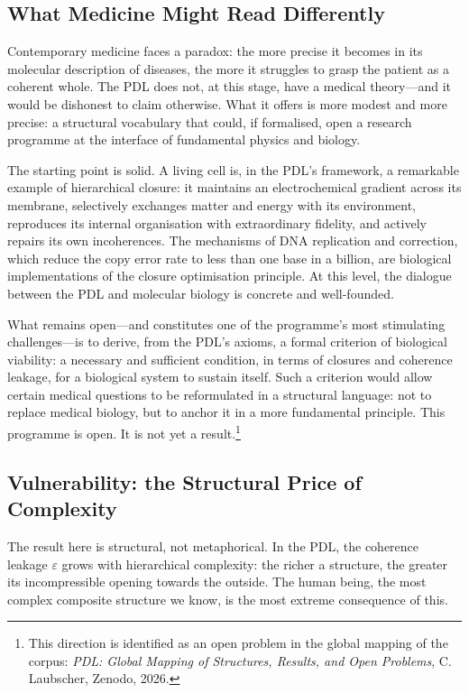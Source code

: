 \documentclass[12pt, a4paper, openright]{book}
\begin{document}
\subsection*{What Medicine Might Read Differently}

Contemporary medicine faces a paradox: the more precise it becomes in its molecular description of diseases, the more it struggles to grasp the patient as a coherent whole. The PDL does not, at this stage, have a medical theory---and it would be dishonest to claim otherwise. What it offers is more modest and more precise: a structural vocabulary that could, if formalised, open a research programme at the interface of fundamental physics and biology.

\medskip

The starting point is solid. A living cell is, in the PDL's framework, a remarkable example of hierarchical closure: it maintains an electrochemical gradient across its membrane, selectively exchanges matter and energy with its environment, reproduces its internal organisation with extraordinary fidelity, and actively repairs its own incoherences. The mechanisms of DNA replication and correction, which reduce the copy error rate to less than one base in a billion, are biological implementations of the closure optimisation principle. At this level, the dialogue between the PDL and molecular biology is concrete and well-founded.

\medskip

What remains open---and constitutes one of the programme's most stimulating challenges---is to derive, from the PDL's axioms, a formal criterion of biological viability: a necessary and sufficient condition, in terms of closures and coherence leakage, for a biological system to sustain itself. Such a criterion would allow certain medical questions to be reformulated in a structural language: not to replace medical biology, but to anchor it in a more fundamental principle. This programme is open. It is not yet a result.\footnote{This direction is identified as an open problem in the global mapping of the corpus: \textit{PDL: Global Mapping of Structures, Results, and Open Problems}, C.\,Laubscher, Zenodo, 2026.}

\subsection*{Vulnerability: the Structural Price of Complexity}

The result here is structural, not metaphorical. In the PDL, the coherence leakage $\varepsilon$ grows with hierarchical complexity: the richer a structure, the greater its incompressible opening towards the outside. The human being, the most complex composite structure we know, is the most extreme consequence of this.
\end{document}
